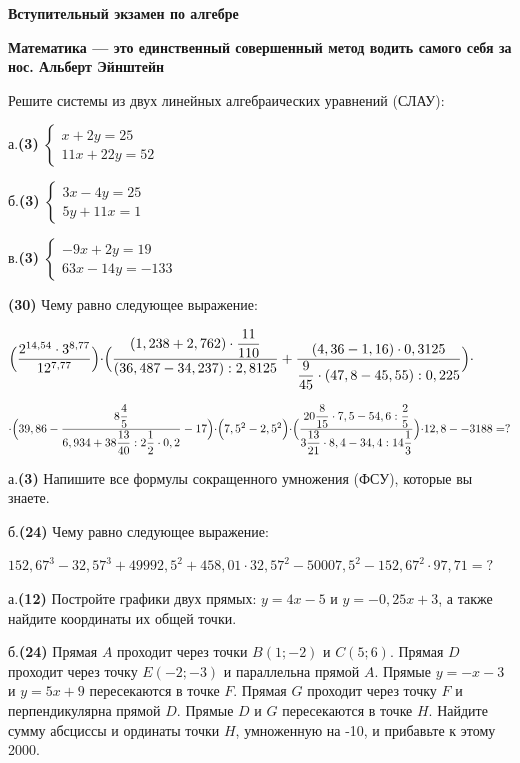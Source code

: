 \hspace{3mm}

\centerline{\bf \Huge Вступительный экзамен по алгебре}


\begin{flushright}
        \scriptsize{\textbf{Математика — это единственный совершенный метод водить самого себя за нос. Альберт Эйнштейн}}
\end{flushright}

 Решите системы из двух линейных алгебраических уравнений (СЛАУ):

а.\textbf{(3)} $ \begin{cases}
   x + 2y = 25
   \\
   11x + 22y = 52
 \end{cases}$

б.\textbf{(3)} $\begin{cases}
    3x - 4y = 25
   \\
   5y + 11x = 1
 \end{cases}$

в.\textbf{(3)} $\begin{cases}
   -9x + 2y = 19
   \\
   63x - 14y = -133
 \end{cases}$


\textbf{(30)} Чему равно следующее выражение: 

$\Bigr(\dfrac{2^{14,54} \cdot 3^{8,77}}{12^{7,77}}\Bigl)\cdot\Bigr(\dfrac{(1,238+2,762) \cdot \dfrac{11}{110}}{(36,487-34,237): 2,8125}+\dfrac{(4,36-1,16) \cdot 0,3125}{\dfrac{9}{45} \cdot(47,8-45,55): 0,225}\Bigl)\cdot$ 

$\cdot \Bigr(39,86-\dfrac{8 \dfrac{4}{5}}{6,934+38 \dfrac{13}{40}: 2 \dfrac{1}{2} \cdot 0,2}-17\Bigl)\cdot\Bigr(7,5^2-2,5^2\Bigl)\cdot\Bigr(\dfrac{20\dfrac{8}{15}\cdot7,5-54,6:\dfrac{2}{5}}{3\dfrac{13}{21}\cdot8,4-34,4:14\dfrac{1}{3}}\Bigl)\cdot12,8--3188=?$



 а.\textbf{(3)} Напишите все формулы сокращенного умножения (ФСУ), которые вы знаете. 

б.\textbf{(24)} Чему равно следующее выражение: 

$152,67^{3}-32,57^{3}+49992,5^{2}+458,01\cdot32,57^{2}-50007,5^{2}-152,67^{2}\cdot97,71=?$

 а.\textbf{(12)} Постройте графики двух прямых: $y=4x-5$ и $y=-0,25x+3$, а также найдите координаты их общей точки.

б.\textbf{(24)} Прямая $A$ проходит через точки $B(1;-2)$ и $C(5;6)$. Прямая $D$ проходит через точку $E(-2;-3)$ и параллельна прямой $A$. Прямые $y=-x-3$ и $y=5x+9$ пересекаются в точке $F$. Прямая $G$ проходит через точку $F$ и перпендикулярна прямой $D$. Прямые $D$ и $G$ пересекаются в точке $H$. Найдите сумму абсциссы и ординаты точки $H$, умноженную на -10, и прибавьте к этому 2000.

